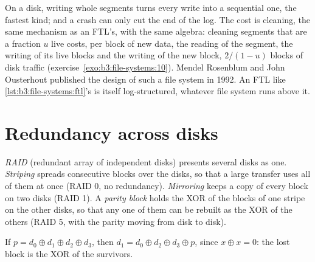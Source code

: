 On a disk, writing whole segments turns every write into a sequential one, the fastest kind; and a crash can only cut the end of the log. The cost is cleaning, the same mechanism as an FTL's, with the same algebra: cleaning segments that are a fraction $u$ live costs, per block of new data, the reading of the segment, the writing of its live blocks and the writing of the new block, $2/(1 - u)$ blocks of disk traffic (exercise~\ref{exo:b3:file-systems:10}). Mendel Rosenblum and John Ousterhout published the design of such a file system in 1992. %
An FTL like \cref{lst:b3:file-systems:ftl}'s is itself log-structured, whatever file system runs above it.

\section{Redundancy across disks}\label{sec:b3:file-systems:raid}

\begin{definition}\label{def:b3:file-systems:raid}
\emph{RAID} (redundant array of independent disks) presents several disks as one. \emph{Striping} spreads consecutive blocks over the disks, so that a large transfer uses all of them at once (RAID 0, no redundancy). \emph{Mirroring} keeps a copy of every block on two disks (RAID 1). A \emph{parity block} holds the XOR of the blocks of one stripe on the other disks, so that any one of them can be rebuilt as the XOR of the others (RAID 5, with the parity moving from disk to disk).
\end{definition}

If $p = d_0 \oplus d_1 \oplus d_2 \oplus d_3$, then $d_1 = d_0 \oplus d_2 \oplus d_3 \oplus p$, since $x \oplus x = 0$: the lost block is the XOR of the survivors.

\label{lst:b3:file-systems:raid}

\label{out:b3:file-systems:raid}

